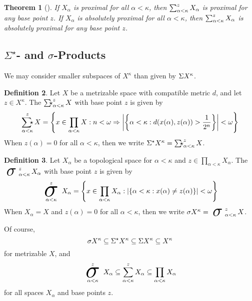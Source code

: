 \documentclass{amsart}
\newtheorem{theorem}{Theorem}[section]
\theoremstyle{definition}
\newtheorem{definition}[theorem]{Definition}
\begin{document}
  \begin{theorem}[\cite{MR3239205}]
    If \(X_\alpha\) is proximal for all \(\alpha<\kappa\),
    then \(\sum_{\alpha<\kappa}^{z}X_\alpha\) is proximal for any
    base point \(z\).
    If \(X_\alpha\) is absolutely proximal for all \(\alpha<\kappa\),
    then \(\sum_{\alpha<\kappa}^{z}X_\alpha\) is absolutely
    proximal for any base point \(z\).
  \end{theorem}

\subsection{\(\Sigma^\star\)- and \(\sigma\)-Products}

  We may consider smaller subspaces of
  \(X^\kappa\) than given by \({\Sigma X^\kappa}\).

  \begin{definition}
    Let \(X\) be a metrizable space with
    compatible metric \(d\), and let \(z\in X^\kappa\).
    The 
    \(\SigmaStarProd_{\alpha<\kappa}^{z}X\)
    with base point \(z\) is given by
    \[
      \SigmaStarProd_{\alpha<\kappa}^{z}X
        =
      \left\{
        x\in \prod_{\alpha<\kappa}X
      :
        n<\omega
      \Rightarrow
        \left|\left\{
          \alpha<\kappa:d(x(\alpha),z(\alpha))>\frac{1}{2^n}
        \right\}\right|
        <\omega
      \right\}
    \]
    When \(z(\alpha)=0\) for all \(\alpha<\kappa\),
    then we write
    \(\SigmaStarPower{X}{\kappa}=\SigmaStarProd_{\alpha<\kappa}^z X\).
  \end{definition}

  \begin{definition}
    Let \(X_\alpha\) be a topological space for \(\alpha<\kappa\)
    and \(z\in\prod_{\alpha<\kappa}X_\alpha\).
    The  \(\sigmaProd_{\alpha<\kappa}^{z}X_\alpha\)
    with base point \(z\) is given by
    \[
      \sigmaProd_{\alpha<\kappa}^{z}X_\alpha
        =
      \left\{
        x\in \prod_{\alpha<\kappa}X_\alpha
      :
        |\{\alpha<\kappa:x(\alpha)\not=z(\alpha)\}|<\omega
      \right\}
    \]
    When \(X_\alpha=X\) and \(z(\alpha)=0\) for all \(\alpha<\kappa\),
    then we write \(\sigmaPower{X}{\kappa}=\sigmaProd_{\alpha<\kappa}^z X\).
  \end{definition}

  Of course,
    \[
      {\sigma X^\kappa}
        \subseteq
      {\Sigma^\star X^\kappa}
        \subseteq
      {\Sigma X^\kappa}
        \subseteq
      X^\kappa
    \]
  for metrizable \(X\), and
    \[
      \sigmaProd_{\alpha<\kappa}^{z}X_\alpha
        \subseteq
      \SigmaProd_{\alpha<\kappa}^{z}X_\alpha
        \subseteq
      \prod_{\alpha<\kappa}X_\alpha
    \]
  for all spaces \(X_\alpha\) and base points \(z\).
\end{document}
